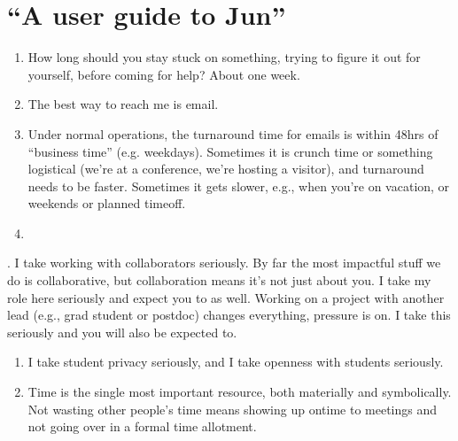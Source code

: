 \documentclass[letterpaper,10pt,english]{sphinxmanual}
\begin{document}
\section{“A user guide to Jun”}
\label{\detokenize{06UserGuideToJun:a-user-guide-to-jun}}\begin{enumerate}
%
\item {} 
\sphinxAtStartPar
How long should you stay stuck on something, trying to figure it out for yourself, before coming for help? About one week.

\item {} 
\sphinxAtStartPar
The best way to reach me is e\sphinxhyphen{}mail.

\item {} 
\sphinxAtStartPar
Under normal operations, the turnaround time for e\sphinxhyphen{}mails is within 48hrs of “business time” (e.g. weekdays). Sometimes it is crunch time or something logistical (we’re at a conference, we’re hosting a visitor), and turnaround needs to be faster. Sometimes it gets slower, e.g., when you’re on vacation, or weekends or planned time\sphinxhyphen{}off.

\item {} 
\sphinxAtStartPar
{}

\end{enumerate}

. I take working with collaborators seriously.  By far the most impactful stuff we do is collaborative, but collaboration means it’s not just about you. I take my role here seriously and expect you to as well.
Working on a project with another lead (e.g., grad student or postdoc) changes everything, pressure is on. I take this seriously and you will also be expected to.
\begin{enumerate}
%
\setcounter{enumi}{5}
\item {} 
\sphinxAtStartPar
I take student privacy seriously, and I take openness with students seriously.

\item {} 
\sphinxAtStartPar
Time is the single most important resource, both materially and symbolically. Not wasting other people’s time means showing up on\sphinxhyphen{}time to meetings and not going over in a formal time allotment.

\end{enumerate}
\end{document}
